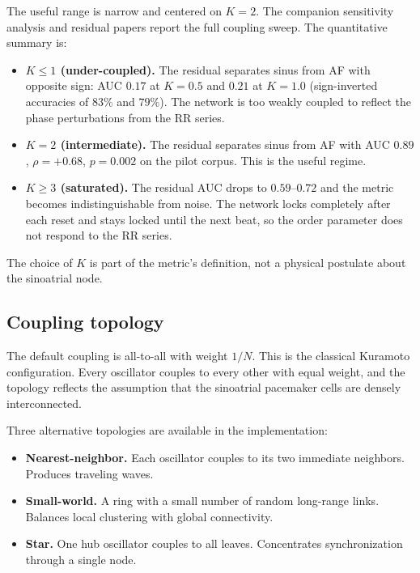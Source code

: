 \documentclass[11pt]{article}
\begin{document}
The useful range is narrow and centered on $K = 2$. The companion
sensitivity analysis and residual papers report the full coupling sweep.
The quantitative summary is:

\begin{itemize}
\item \textbf{$K \leq 1$ (under-coupled).} The residual separates sinus
from AF with opposite sign: AUC $0.17$ at $K = 0.5$ and $0.21$ at
$K = 1.0$ (sign-inverted accuracies of $83\%$ and $79\%$). The network
is too weakly coupled to reflect the phase perturbations from the RR
series.
\item \textbf{$K = 2$ (intermediate).} The residual separates sinus from
AF with AUC $0.89$, $\rho = +0.68$, $p = 0.002$ on the pilot corpus.
This is the useful regime.
\item \textbf{$K \geq 3$ (saturated).} The residual AUC drops to
$0.59$--$0.72$ and the metric becomes indistinguishable from noise.
The network locks completely after each reset and stays locked until the
next beat, so the order parameter does not respond to the RR series.
\end{itemize}

The choice of $K$ is part of the metric's definition, not a physical
postulate about the sinoatrial node.

\subsection{Coupling topology}

The default coupling is all-to-all with weight $1/N$. This is the
classical Kuramoto configuration. Every oscillator couples to every
other with equal weight, and the topology reflects the assumption that
the sinoatrial pacemaker cells are densely interconnected.

Three alternative topologies are available in the implementation:

\begin{itemize}
\item \textbf{Nearest-neighbor.} Each oscillator couples to its two
immediate neighbors. Produces traveling waves.
\item \textbf{Small-world.} A ring with a small number of random
long-range links. Balances local clustering with global connectivity.
\item \textbf{Star.} One hub oscillator couples to all leaves.
Concentrates synchronization through a single node.
\end{itemize}
\end{document}
